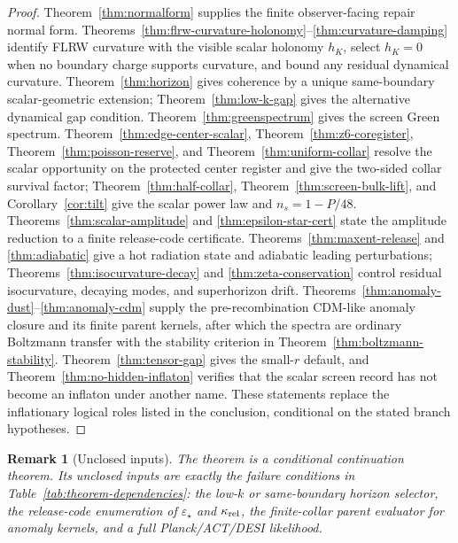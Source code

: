 \documentclass[11pt]{article}
\newtheorem{remark}[theorem]{Remark}
\begin{document}
\begin{proof}
Theorem~\ref{thm:normalform} supplies the finite observer-facing repair normal form.
Theorems~\ref{thm:flrw-curvature-holonomy}--\ref{thm:curvature-damping} identify FLRW curvature with the
visible scalar holonomy \(h_K\), select \(h_K=0\) when no boundary charge supports curvature, and
bound any residual dynamical curvature. Theorem~\ref{thm:horizon} gives coherence by a unique
same-boundary scalar-geometric extension; Theorem~\ref{thm:low-k-gap} gives the alternative
dynamical gap condition. Theorem~\ref{thm:greenspectrum} gives the screen Green spectrum.
Theorem~\ref{thm:edge-center-scalar}, Theorem~\ref{thm:z6-coregister},
Theorem~\ref{thm:poisson-reserve}, and Theorem~\ref{thm:uniform-collar} resolve the scalar opportunity on
the protected center register and give the two-sided collar survival factor; Theorem~\ref{thm:half-collar},
Theorem~\ref{thm:screen-bulk-lift}, and Corollary~\ref{cor:tilt} give the scalar power law and
\(n_s=1-P/48\). Theorems~\ref{thm:scalar-amplitude} and \ref{thm:epsilon-star-cert} state the
amplitude reduction to a finite release-code certificate. Theorems~\ref{thm:maxent-release} and \ref{thm:adiabatic} give a hot radiation state
and adiabatic leading perturbations; Theorems~\ref{thm:isocurvature-decay} and
\ref{thm:zeta-conservation} control residual isocurvature, decaying modes, and superhorizon drift.
Theorems~\ref{thm:anomaly-dust}--\ref{thm:anomaly-cdm} supply the pre-recombination CDM-like anomaly
closure and its finite parent kernels, after which the spectra are ordinary Boltzmann transfer with
the stability criterion in Theorem~\ref{thm:boltzmann-stability}. Theorem~\ref{thm:tensor-gap} gives the small-\(r\) default,
and Theorem~\ref{thm:no-hidden-inflaton} verifies that the scalar screen record has not become an
inflaton under another name. These statements replace the inflationary logical roles listed in the
conclusion, conditional on the stated branch hypotheses.
\end{proof}

\begin{remark}[Unclosed inputs]
The theorem is a conditional continuation theorem. Its unclosed inputs are exactly the
failure conditions in Table~\ref{tab:theorem-dependencies}: the low-\(k\) or same-boundary horizon
selector, the release-code enumeration of \(\varepsilon_\star\) and \(\kappa_{\rm rel}\), the finite-collar parent evaluator
for anomaly kernels, and a full Planck/ACT/DESI likelihood.
\end{remark}
\end{document}
